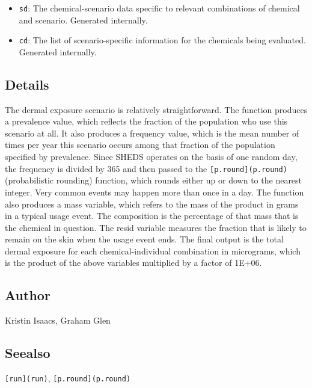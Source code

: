 \documentclass[
]{article}
\providecommand{\tightlist}{%
  \setlength{\itemsep}{0pt}\setlength{\parskip}{0pt}}
\begin{document}
\begin{itemize}
\tightlist
\item
  \texttt{sd}: The chemical-scenario data specific to relevant
  combinations of chemical and scenario. Generated internally.
\item
  \texttt{cd}: The list of scenario-specific information for the
  chemicals being evaluated. Generated internally.
\end{itemize}

\hypertarget{details-8}{%
\subsection{Details}\label{details-8}}

The dermal exposure scenario is relatively straightforward. The function
produces a prevalence value, which reflects the fraction of the
population who use this scenario at all. It also produces a frequency
value, which is the mean number of times per year this scenario occurs
among that fraction of the population specified by prevalence. Since
SHEDS operates on the basis of one random day, the frequency is divided
by 365 and then passed to the \texttt{{[}p.round{]}(p.round)}
(probabilistic rounding) function, which rounds either up or down to the
nearest integer. Very common events may happen more than once in a day.
The function also produces a mass variable, which refers to the mass of
the product in grams in a typical usage event. The composition is the
percentage of that mass that is the chemical in question. The resid
variable measures the fraction that is likely to remain on the skin when
the usage event ends. The final output is the total dermal exposure for
each chemical-individual combination in micrograms, which is the product
of the above variables multiplied by a factor of 1E+06.

\hypertarget{author-9}{%
\subsection{Author}\label{author-9}}

Kristin Isaacs, Graham Glen

\hypertarget{seealso-8}{%
\subsection{Seealso}\label{seealso-8}}

\texttt{{[}run{]}(run)}, \texttt{{[}p.round{]}(p.round)}
\end{document}
